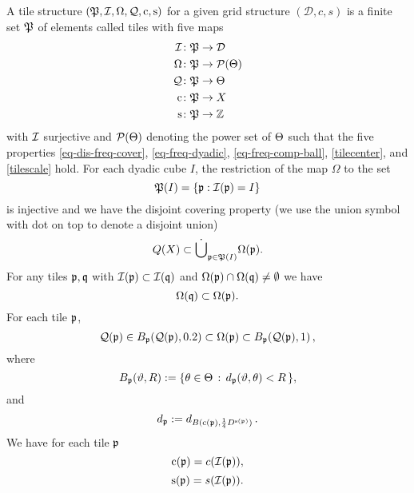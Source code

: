 A tile structure  $(\fP,\sc,\fc,\fcc,\pc,\ps)$
for a given grid structure $(\mathcal{D}, c, s)$
is a finite set $\fP$  of elements called tiles with five maps
\begin{align*}
\sc&\colon \fP\to {\mathcal{D}}\\
\fc&\colon \fP\to \mathcal{P}(\Mf) \\
\fcc &\colon \fP\to \Mf\\
\pc &\colon \fP\to X\\
\ps &\colon \fP\to \mathbb{Z}
\end{align*}
with $\sc$ surjective and $\mathcal{P}(\Mf)$ denoting the power set of $\Mf$ such that the five properties \eqref{eq-dis-freq-cover}, \eqref{eq-freq-dyadic},
\eqref{eq-freq-comp-ball}, \eqref{tilecenter}, and
\eqref{tilescale} hold.
For each dyadic cube $I$, the restriction of the  map $\Omega$ to the set
\begin{equation}\label{injective}
    \fP(I)=\{\fp: \sc(\fp) =I\}
\end{equation}
is injective
and we have the disjoint covering property (we use the union symbol with dot on top to denote a disjoint union)
\begin{equation}\label{eq-dis-freq-cover}
\tQ(X)\subset \dot{\bigcup}_{\fp\in \fP(I)}\fc(\fp).
\end{equation}
For any tiles $\fp,\fq$ with $\sc(\fp)\subset \sc(\fq)$ and $\fc(\fp) \cap \fc(\fq) \neq  \emptyset$ we have
\begin{equation} \label{eq-freq-dyadic}
\fc(\fq)\subset \fc(\fp) .
\end{equation}
For each tile $\fp$,
        \begin{equation}\label{eq-freq-comp-ball}
        \fcc(\fp)\in B_{\fp}(\fcc(\fp), 0.2) \subset \fc(\fp) \subset B_{\fp}(\fcc(\fp),1)\,,
        \end{equation}
        where
\begin{equation}
    B_{\fp} (\mfa, R) := \{\mfb \in \Mf \, : \, d_{\fp}(\mfa, \mfb) < R\,\} ,
\end{equation}
 and
\begin{equation}\label{defdp}
d_{\fp} := d_{B(\pc(\fp),\frac 14 D^{\ps(\fp)})}\, .
\end{equation}
We have for each tile $\fp$
\begin{equation}\label{tilecenter}
    \pc(\fp)=c(\sc(\fp)),
\end{equation}
\begin{equation}\label{tilescale}
    \ps(\fp)=s(\sc(\fp)).
\end{equation}


